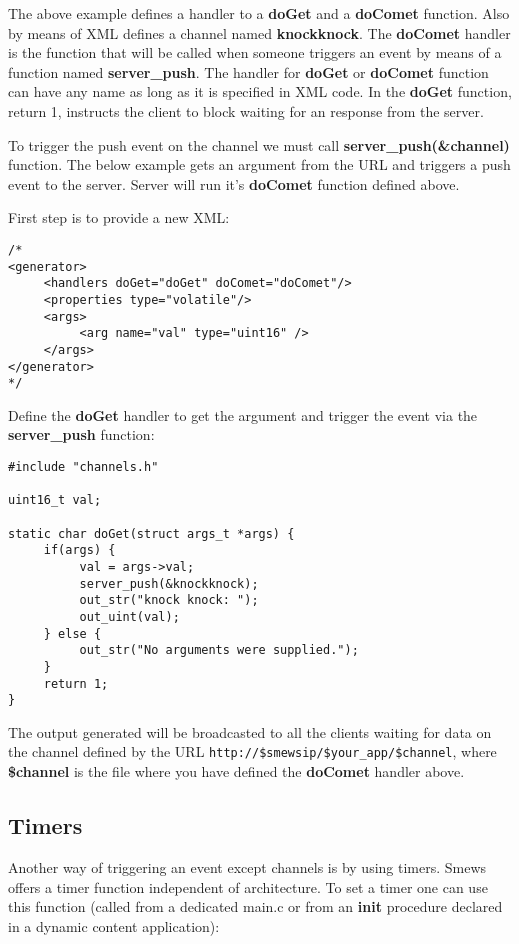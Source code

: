 \documentclass{report}
\begin{document}
The above example defines a handler to a \textbf{doGet} and a \textbf{doComet} function. Also by means of XML defines a channel named \textbf{knockknock}. The \textbf{doComet} handler is the function that will be called when someone triggers an event by means of a function named \textbf{server\_push}. The handler for \textbf{doGet} or \textbf{doComet} function can have any name as long as it is specified in XML code. In the \textbf{doGet} function, return 1, instructs the client to block waiting for an response from the server.

To trigger the push event on the channel we must call \textbf{server\_push(\&channel)} function. The below example gets an argument from the URL and triggers a push event to the server. Server will run it's \textbf{doComet} function defined above.

First step is to provide a new XML:
\begin{verbatim}
/*
<generator>
     <handlers doGet="doGet" doComet="doComet"/>
     <properties type="volatile"/>
     <args>
          <arg name="val" type="uint16" />
     </args>
</generator>
*/
\end{verbatim}

Define the \textbf{doGet} handler to get the argument and trigger the event via the \textbf{server\_push} function:
\begin{verbatim}
#include "channels.h"

uint16_t val;

static char doGet(struct args_t *args) {
     if(args) {
          val = args->val;
          server_push(&knockknock);
          out_str("knock knock: ");
          out_uint(val);
     } else {
          out_str("No arguments were supplied.");
     }
     return 1;
}
\end{verbatim}

The output generated will be broadcasted to all the clients waiting for data on the channel defined by the URL \texttt{http://\$smewsip/\$your\_app/\$channel}, where \textbf{\$channel} is the file where you have defined the \textbf{doComet} handler above.

\subsection{Timers}

Another way of triggering an event except channels is by using timers. Smews offers a timer function independent of architecture.
To set a timer one can use this function (called from a dedicated main.c or from an \textbf{init} procedure declared in a dynamic content application):
\end{document}
